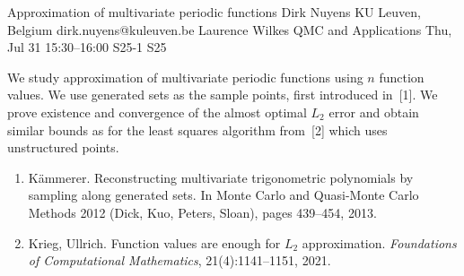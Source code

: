 \documentclass[12pt,lettersize,oneside]{book} %
\begin{document}
\begin{talk}
\end{talk}

\begin{talk}
  {Approximation of multivariate periodic functions}%
  {Dirk Nuyens}%
  {KU Leuven, Belgium}%
  {dirk.nuyens@kuleuven.be}%
  {Laurence Wilkes}%
  {QMC and Applications}%
  {Thu, Jul 31 15:30--16:00}%
  {S25-1}%
  {S25}%
    
   
  We study approximation of multivariate periodic functions using $n$
  function values. We use generated sets as the sample points, first
  introduced in~[1]. We prove existence and convergence of the almost
  optimal $L_2$ error and obtain similar bounds as for the least squares
  algorithm from~[2] which uses unstructured points.

\medskip

\begin{enumerate}
  \item[{[1]}]
    K{\"a}mmerer.
    Reconstructing multivariate trigonometric polynomials by sampling along generated sets.
    In Monte Carlo and Quasi-Monte Carlo Methods 2012 (Dick, Kuo, Peters, Sloan), pages 439--454, 2013.
  \item[{[2]}]
    Krieg, Ullrich.
    Function values are enough for $L_2$ approximation.
    \emph{Foundations of Computational Mathematics}, 21(4):1141--1151, 2021.
\end{enumerate}

\end{talk}
\end{document}

